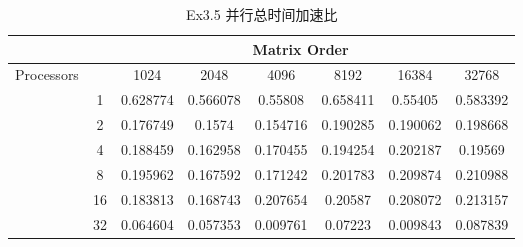 \documentclass[UTF8]{article}
\begin{document}
\begin{table}[h]
    \caption{Ex3.5 并行总时间加速比}
    \label{tab:my-table}
    \centering
    \scalebox{0.8} {
    \begin{tabular}{|c|c|c|c|c|c|c|c|}
    \hline
                                & \multicolumn{7}{c|}{Matrix Order}                                    \\ \hline
    \multirow{7}{*}{Processors} &    & 1024     & 2048     & 4096     & 8192     & 16384    & 32768    \\ \cline{2-8} 
                                & 1  & 0.628774 & 0.566078 & 0.55808  & 0.658411 & 0.55405  & 0.583392 \\ \cline{2-8} 
                                & 2  & 0.176749 & 0.1574   & 0.154716 & 0.190285 & 0.190062 & 0.198668 \\ \cline{2-8} 
                                & 4  & 0.188459 & 0.162958 & 0.170455 & 0.194254 & 0.202187 & 0.19569  \\ \cline{2-8} 
                                & 8  & 0.195962 & 0.167592 & 0.171242 & 0.201783 & 0.209874 & 0.210988 \\ \cline{2-8} 
                                & 16 & 0.183813 & 0.168743 & 0.207654 & 0.20587  & 0.208072 & 0.213157 \\ \cline{2-8} 
                                & 32 & 0.064604 & 0.057353 & 0.009761 & 0.07223  & 0.009843 & 0.087839 \\ \hline
    \end{tabular}}
    \end{table}
\end{document}
